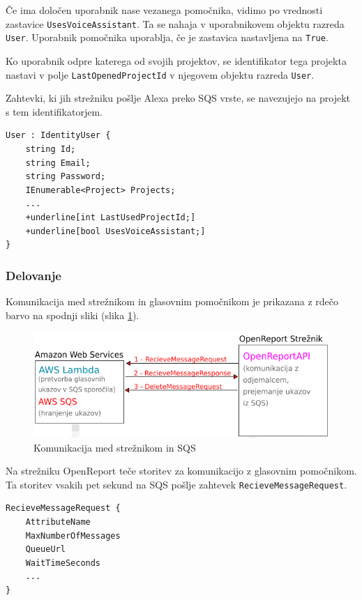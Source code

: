 \documentclass[a4paper, 12pt]{book}
\begin{document}
Če ima določen uporabnik nase vezanega pomočnika, vidimo po vrednosti zastavice \texttt{UsesVoiceAssistant}.
Ta se nahaja v uporabnikovem objektu razreda \texttt{User}.
Uporabnik pomočnika uporablja, če je zastavica nastavljena na \texttt{True}.

Ko uporabnik odpre katerega od svojih projektov, se identifikator tega projekta nastavi v polje \texttt{LastOpenedProjectId} v njegovem objektu razreda \texttt{User}.

Zahtevki, ki jih strežniku pošlje Alexa preko SQS vrste, se navezujejo na projekt s tem identifikatorjem.

\begin{Verbatim}[commandchars=+\[\]]
User : IdentityUser {
    string Id; 
    string Email;
    string Password; 
    IEnumerable<Project> Projects;
    ... 
    +underline[int LastUsedProjectId;]
    +underline[bool UsesVoiceAssistant;]
}
\end{Verbatim}

\subsubsection{Delovanje}

Komunikacija med strežnikom in glasovnim pomočnikom je prikazana z rdečo barvo na spodnji sliki (slika \ref{plan_sqs_server}).

\begin{figure}[H]
\begin{center}
\includegraphics[width=13cm]{plan_sqs_server}
\end{center}
\caption{Komunikacija med strežnikom in SQS}
\label{plan_sqs_server}
\end{figure}

Na strežniku OpenReport teče storitev za komunikacijo z glasovnim pomočnikom.
Ta storitev vsakih pet sekund na SQS pošlje zahtevek \texttt{RecieveMessageRequest}.

\begin{Verbatim}[commandchars=+\[\]]
RecieveMessageRequest {
    AttributeName 
    MaxNumberOfMessages 
    QueueUrl 
    WaitTimeSeconds
    ... 
} 
\end{Verbatim}
\end{document}
